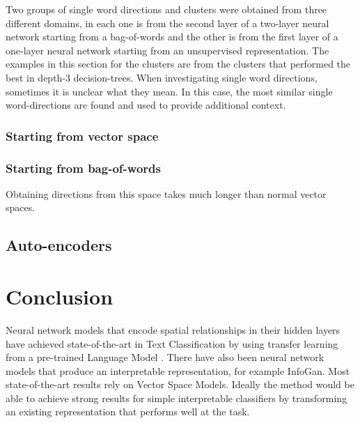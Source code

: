 Two groups of single word directions and clusters were obtained from three different domains, in each one is from the second layer of  a two-layer neural network starting from a bag-of-words and the other is from the first layer of a one-layer neural network starting from an unsupervised representation. The examples in this section for the clusters are from the clusters that performed the best in depth-3 decision-trees. When investigating single word directions, sometimes it is unclear what they mean. In this case, the most similar single word-directions are found and used to provide additional context.







\subsubsection{Starting from vector space}

\subsubsection{Starting from bag-of-words}

Obtaining directions from this space takes much longer than normal vector spaces.

\subsection{Auto-encoders}

\section{Conclusion}



 Neural network models that encode spatial relationships in their hidden layers have achieved state-of-the-art in Text Classification by using transfer learning from a pre-trained Language Model \cite{Gong2018}. There have also been neural network models that produce an interpretable representation, for example InfoGan.
 Most state-of-the-art results rely on Vector Space Models. Ideally the method would be able to achieve strong results for simple interpretable classifiers by transforming an existing representation that performs well at the task.
 

